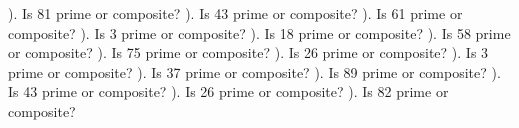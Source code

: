 \documentclass{article}%
\begin{document}
\newline%
). Is 81 prime or composite?%
\newline%
\newline%
). Is 43 prime or composite?%
\newline%
\newline%
). Is 61 prime or composite?%
\newline%
\newline%
). Is 3 prime or composite?%
\newline%
\newline%
). Is 18 prime or composite?%
\newline%
\newline%
). Is 58 prime or composite?%
\newline%
\newline%
). Is 75 prime or composite?%
\newline%
\newline%
). Is 26 prime or composite?%
\newline%
\newline%
). Is 3 prime or composite?%
\newline%
\newline%
). Is 37 prime or composite?%
\newline%
\newline%
). Is 89 prime or composite?%
\newline%
\newline%
). Is 43 prime or composite?%
\newline%
\newline%
). Is 26 prime or composite?%
\newline%
\newline%
). Is 82 prime or composite?%
\newline%
\newline%
\newline%
\end{document}
